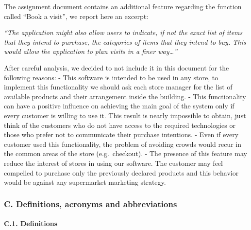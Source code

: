 The assignment document contains an additional feature regarding the
function called ``Book a visit'', we report here an excerpt:

\emph{``The application might also allow users to indicate, if not the
exact list of items that they intend to purchase, the categories of
items that they intend to buy. This would allow the application to plan
visits in a finer way\ldots{}''}

After careful analysis, we decided to not include it in this document
for the following reasons: - This software is intended to be used in any
store, to implement this functionality we should ask each store manager
for the list of available products and their arrangement inside the
building. - This functionality can have a positive influence on
achieving the main goal of the system only if every customer is willing
to use it. This result is nearly impossible to obtain, just think of the
customers who do not have access to the required technologies or those
who prefer not to communicate their purchase intentions. - Even if every
customer used this functionality, the problem of avoiding crowds would
recur in the common areas of the store (e.g.~checkout). - The presence
of this feature may reduce the interest of stores in using our software.
The customer may feel compelled to purchase only the previously declared
products and this behavior would be against any supermarket marketing
strategy.

\hypertarget{c.-definitions-acronyms-and-abbreviations}{%
\subsubsection{C. Definitions, acronyms and
abbreviations}\label{c.-definitions-acronyms-and-abbreviations}}

\hypertarget{c.1.-definitions}{%
\paragraph{C.1. Definitions}\label{c.1.-definitions}}

